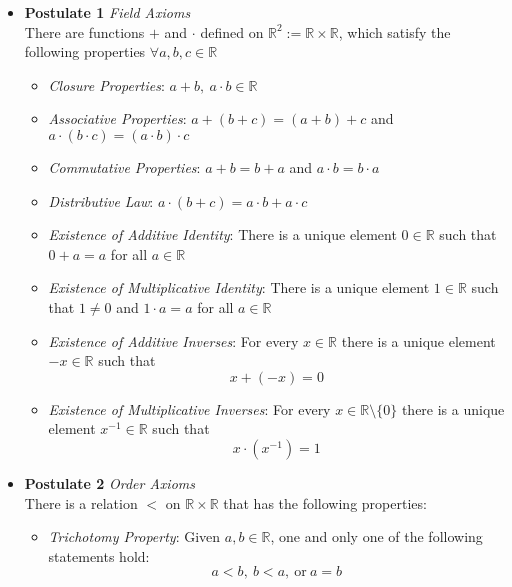 \documentclass[11pt,a4paper]{article}
\begin{document}
\begin{itemize}
    \item \textbf{Postulate 1} \emph{Field Axioms} \\
        There are functions $+$ and $\cdot$ defined on
        $\mathbb{R}^2 := \mathbb{R} \times \mathbb{R}$,
        which satisfy the following properties $\forall a, b, c \in \mathbb{R}$

        \begin{itemize}
            \item \emph{Closure Properties}:
                $a + b, \ a \cdot b \in \mathbb{R}$

            \item \emph{Associative Properties}:
                $a + (b + c) = (a + b) + c$ and
                $a \cdot (b \cdot c) = (a \cdot b) \cdot c$

            \item \emph{Commutative Properties}:
                $a + b = b + a$ and $a \cdot b = b \cdot a$

            \item \emph{Distributive Law}:
                $a \cdot (b + c) = a \cdot b + a \cdot c$

            \item \emph{Existence of Additive Identity}:
                There is a unique element $0 \in \mathbb{R}$ such that
                $0 + a = a$ for all $a \in \mathbb{R}$

            \item \emph{Existence of Multiplicative Identity}:
                There is a unique element $1 \in \mathbb{R}$ such that
                $1 \neq 0$ and $1 \cdot a = a$ for all $a \in \mathbb{R}$

            \item \emph{Existence of Additive Inverses}:
                For every $x \in \mathbb{R}$ there is a unique element $-x \in \mathbb{R}$
                such that
                \[
                    x + (-x) = 0
                \]

            \item \emph{Existence of Multiplicative Inverses}:
                For every $x \in \mathbb{R} \setminus \{0\}$ there is a unique element
                $x^{-1} \in \mathbb{R}$ such that
                \[
                    x \cdot (x^{-1}) = 1
                \]
        \end{itemize}

    \item \textbf{Postulate 2} \emph{Order Axioms} \\
        There is a relation $<$ on $\mathbb{R} \times \mathbb{R}$ that has the following
        properties:
        \begin{itemize}
            \item \emph{Trichotomy Property}:
                Given $a, b \in \mathbb{R}$, one and only one of the following statements hold:
                \[
                    a < b, \ b < a, \ \text{or} \ a = b
                \]


\end{itemize}
\end{itemize}
\end{document}
